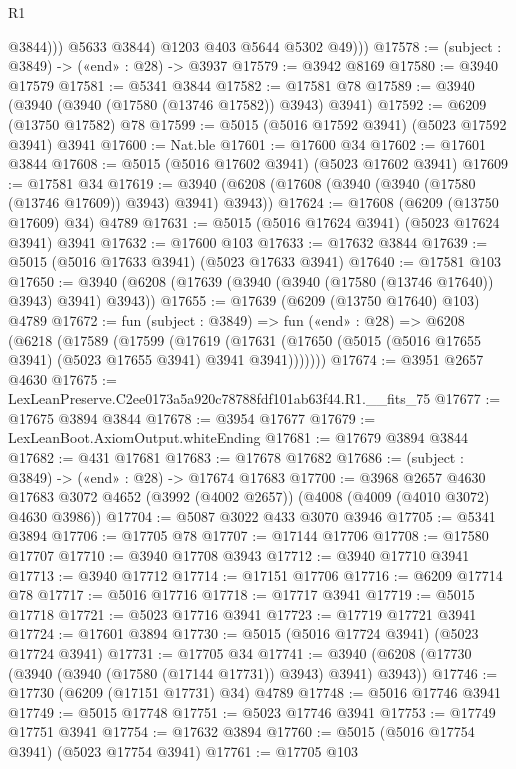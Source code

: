 \begin{lexlean}{R1}
\begin{coremodule}
                  @3844)))
            @5633
            @3844)
          @1203
          @403
          @5644
          @5302
          @49)))
@17578 := (subject : @3849) -> («end» : @28) -> @3937
@17579 := @3942 @8169
@17580 := @3940 @17579
@17581 := @5341 @3844
@17582 := @17581 @78
@17589 := @3940 (@3940 (@3940 (@17580 (@13746 @17582)) @3943) @3941)
@17592 := @6209 (@13750 @17582) @78
@17599 := @5015 (@5016 @17592 @3941) (@5023 @17592 @3941) @3941
@17600 := Nat.ble
@17601 := @17600 @34
@17602 := @17601 @3844
@17608 := @5015 (@5016 @17602 @3941) (@5023 @17602 @3941)
@17609 := @17581 @34
@17619 := @3940 (@6208 (@17608 (@3940 (@3940 (@17580 (@13746 @17609)) @3943) @3941) @3943))
@17624 := @17608 (@6209 (@13750 @17609) @34) @4789
@17631 := @5015 (@5016 @17624 @3941) (@5023 @17624 @3941) @3941
@17632 := @17600 @103
@17633 := @17632 @3844
@17639 := @5015 (@5016 @17633 @3941) (@5023 @17633 @3941)
@17640 := @17581 @103
@17650 := @3940 (@6208 (@17639 (@3940 (@3940 (@17580 (@13746 @17640)) @3943) @3941) @3943))
@17655 := @17639 (@6209 (@13750 @17640) @103) @4789
@17672 := fun (subject : @3849) =>
  fun («end» : @28) =>
  @6208
    (@6218
      (@17589
        (@17599
          (@17619
            (@17631 (@17650 (@5015 (@5016 @17655 @3941) (@5023 @17655 @3941) @3941 @3941)))))))
@17674 := @3951 @2657 @4630
@17675 := LexLeanPreserve.C2ee0173a5a920c78788fdf101ab63f44.R1.__fits_75
@17677 := @17675 @3894 @3844
@17678 := @3954 @17677
@17679 := LexLeanBoot.AxiomOutput.whiteEnding
@17681 := @17679 @3894 @3844
@17682 := @431 @17681
@17683 := @17678 @17682
@17686 := (subject : @3849) -> («end» : @28) -> @17674 @17683
@17700 := @3968
    @2657
    @4630
    @17683
    @3072
    @4652
    (@3992 (@4002 @2657))
    (@4008 (@4009 (@4010 @3072) @4630 @3986))
@17704 := @5087 @3022 @433 @3070 @3946
@17705 := @5341 @3894
@17706 := @17705 @78
@17707 := @17144 @17706
@17708 := @17580 @17707
@17710 := @3940 @17708 @3943
@17712 := @3940 @17710 @3941
@17713 := @3940 @17712
@17714 := @17151 @17706
@17716 := @6209 @17714 @78
@17717 := @5016 @17716
@17718 := @17717 @3941
@17719 := @5015 @17718
@17721 := @5023 @17716 @3941
@17723 := @17719 @17721 @3941
@17724 := @17601 @3894
@17730 := @5015 (@5016 @17724 @3941) (@5023 @17724 @3941)
@17731 := @17705 @34
@17741 := @3940 (@6208 (@17730 (@3940 (@3940 (@17580 (@17144 @17731)) @3943) @3941) @3943))
@17746 := @17730 (@6209 (@17151 @17731) @34) @4789
@17748 := @5016 @17746 @3941
@17749 := @5015 @17748
@17751 := @5023 @17746 @3941
@17753 := @17749 @17751 @3941
@17754 := @17632 @3894
@17760 := @5015 (@5016 @17754 @3941) (@5023 @17754 @3941)
@17761 := @17705 @103

\end{coremodule}
\end{lexlean}

